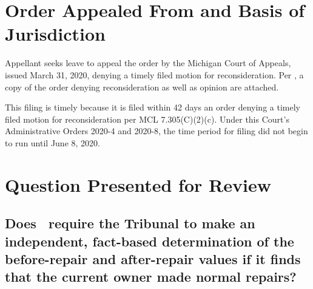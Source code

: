 \documentclass[12pt,\documentclassflag]{michiganCourtOfAppealsBrief}
\begin{document}




\section{Order Appealed From and Basis of Jurisdiction}

Appellant seeks leave to appeal the order by the Michigan Court of Appeals, issued March 31, 2020,
denying a timely filed motion for reconsideration.
Per \cite{MCR 7.305(A)(2)}, a copy of the order denying reconsideration as well as opinion are attached.

This filing is timely because it is filed within 42 days an order denying a timely filed motion for reconsideration per MCL 7.305(C)(2)(c). Under this Court's Administrative Orders 2020-4 and 2020-8, the time period for filing did not begin to run until June 8, 2020.

\newpage
\section{Question Presented for Review}

\subsection{Does \mathieuGast\ require the Tribunal to make
  an independent, fact-based determination of the before-repair and after-repair values 
  if it finds that the current owner made normal repairs?}
\end{document}

